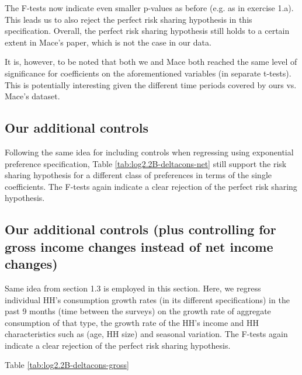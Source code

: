 \documentclass[12pt,a4paper]{article}
\begin{document}
The F-tests now indicate even smaller p-values as before (e.g. as in exercise 1.a). This leads us to also reject the perfect risk sharing hypothesis in this specification. Overall, the perfect risk sharing hypothesis still holds to a certain extent in Mace's paper, which is not the case in our data. 

It is, however, to be noted that both we and Mace both reached the same level of significance for coefficients on the aforementioned variables (in separate t-tests). This is potentially interesting given the different time periods covered by ours vs. Mace's dataset.


\subsection*{Our additional controls}

Following the same idea for including controls when regressing using exponential preference specification, Table \ref{tab:log2.2B-deltacons-net} still support the risk sharing hypothesis for a different class of preferences in terms of the single coefficients. The F-tests again indicate a clear rejection of the perfect risk sharing hypothesis.




\subsection*{Our additional controls (plus controlling for gross income changes instead of net income changes)}

Same idea from section 1.3 is employed in this section. Here, we regress individual HH's consumption growth rates (in its different specifications) in the past 9 months (time between the surveys) on the growth rate of aggregate consumption of that type, the growth rate of the HH's income and HH characteristics such as (age, HH size) and seasonal variation. The F-tests again indicate a clear rejection of the perfect risk sharing hypothesis.

Table \ref{tab:log2.2B-deltacons-gross}


\clearpage
{}


\end{document}
